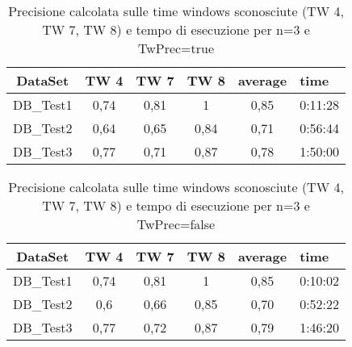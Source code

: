 \begin{table}[H]
	\centering
	\footnotesize
	\begin{tabular}{|cccccp{}|}
	\hline
	\textbf{DataSet} & \textbf{TW 4} & \textbf{ TW 7} & \textbf{TW 8} & \textbf{average} & \textbf{time}\\
	\hline 
	DB\_Test1 & 0,74 & 0,81 & 1 & 0,85 & 0:11:28\\ 
	DB\_Test2 & 0,64 & 0,65 & 0,84 & 0,71 & 0:56:44\\ 
	DB\_Test3 & 0,77 & 0,71 & 0,87 & 0,78 & 1:50:00\\ 
	\hline 
	\end{tabular}
	\caption{Precisione calcolata sulle time windows sconosciute (TW 4, TW 7, TW 8) e tempo di esecuzione per n=3 e TwPrec=true}
\end{table}
\begin{table}[H]
	\centering
	\footnotesize
	\begin{tabular}{|cccccp{}|}
	\hline
	\textbf{DataSet} & \textbf{TW 4} & \textbf{ TW 7} & \textbf{TW 8} & \textbf{average} & \textbf{time}\\
	\hline 
	DB\_Test1 & 0,74 & 0,81 & 1 & 0,85 & 0:10:02\\ 
	DB\_Test2 & 0,6 & 0,66 & 0,85 & 0,70 & 0:52:22\\ 
	DB\_Test3 & 0,77 & 0,72 & 0,87 & 0,79 & 1:46:20\\ 
	\hline 
	\end{tabular}
	\caption{Precisione calcolata sulle time windows sconosciute (TW 4, TW 7, TW 8) e tempo di esecuzione per n=3 e TwPrec=false}
\end{table}



